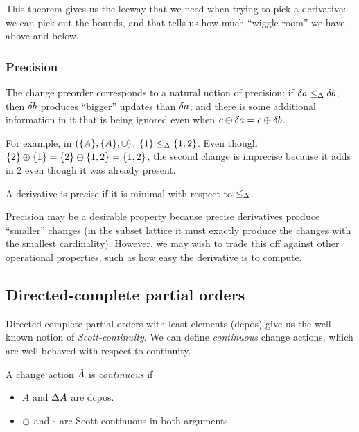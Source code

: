 This theorem gives us the leeway that we need when trying to pick a derivative: we can pick out the
bounds, and that tells us how much ``wiggle room'' we have above and below.

\subsubsection{Precision}

The change preorder corresponds to a natural notion of precision: if $\delta a
\leq_\Delta \delta b$, then $\delta b$ produces ``bigger'' updates than
$\delta a$, and there is some additional information in it that is being
ignored even when $c \oplus \delta a = c \oplus \delta b$.

For example, in $(\{A\},\{A\},\cup)$, $\{1\} \leq_\Delta \{1,2\}$. Even
though $\{2\} \oplus \{1\} = \{2\} \oplus \{1,2\} = \{1,2\}$, the second change is
imprecise because it adds in 2 even though it was already present.


\begin{defn}
  \label{def:precision}
  A derivative is precise if it is minimal with respect to $\leq_\Delta$.
\end{defn}

Precision may be a desirable property because precise derivatives produce
``smaller'' changes (in the subset lattice it must exactly produce the changes
with the smallest cardinality). However, we may wish to trade this off against
other operational properties, such as how easy the derivative is to compute.

\subsection{Directed-complete partial orders}

Directed-complete partial orders with least elements (dcpos) give us the well known notion of
\emph{Scott-continuity}. We can define \emph{continuous} change actions,
which are well-behaved with respect to continuity.

\begin{defn}
  A change action $\hat{A}$ is \emph{continuous} if
  \begin{itemize}
    \item $A$ and $\Delta A$ are dcpos.
    \item $\oplus$ and $\cdot$ are Scott-continuous in both arguments.
  \end{itemize}
\end{defn}

